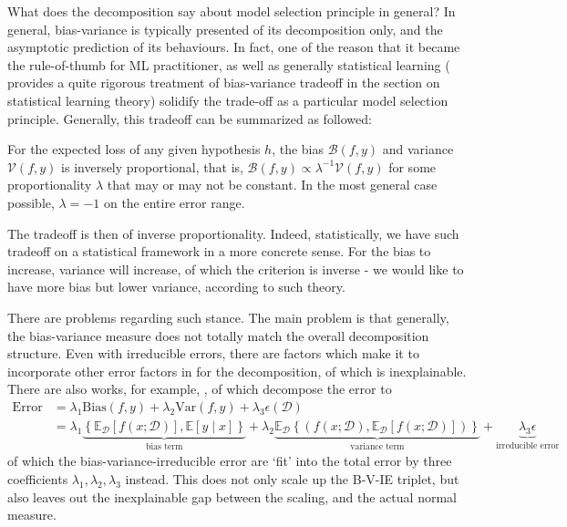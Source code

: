 What does the decomposition say about model selection principle in general? In general, bias-variance is typically presented of its decomposition only, and the asymptotic prediction of its behaviours. In fact, one of the reason that it became the rule-of-thumb for ML practitioner, as well as generally statistical learning (\cite{lafon_understanding_2024} provides a quite rigorous treatment of bias-variance tradeoff in the section on statistical learning theory) solidify the trade-off as a particular model selection principle. Generally, this tradeoff can be summarized as followed: 
\begin{theorem}
    For the expected loss of any given hypothesis $h$, the bias $\mathcal{B}(f,y)$ and variance $\mathcal{V}(f,y)$ is inversely proportional, that is, $\mathcal{B}(f,y)\propto \lambda^{-1} \mathcal{V}(f,y)$ for some proportionality $\lambda$ that may or may not be constant. In the most general case possible, $\lambda = -1$ on the entire error range. 
\end{theorem}

The tradeoff is then of inverse proportionality. Indeed, statistically, we have such tradeoff on a statistical framework in a more concrete sense. For the bias to increase, variance will increase, of which the criterion is inverse - we would like to have more bias but lower variance, according to such theory. 

There are problems regarding such stance. The main problem is that generally, the bias-variance measure does not totally match the overall decomposition structure. Even with irreducible errors, there are factors which make it to incorporate other error factors in for the decomposition, of which is inexplainable. There are also works, for example, \cite{domingos_unifeid_2000}, of which decompose the error to 
\begin{equation*}
        \begin{split}
            \mathrm{Error} & = \lambda_{1} \mathrm{Bias}(f,y) + \lambda_{2}\mathrm{Var}(f,y)+ \lambda_{3}\epsilon(\mathcal{D})\\ 
            & = \lambda_{1}\underbrace{\left\{ \mathbb{E}_{\mathcal{D}}[f(x;\mathcal{D})] , \mathbb{E}[y\mid x] \right\}}_{\text{bias term}} +\lambda_{2} \underbrace{\mathbb{E}_{\mathcal{D}} \left\{(f(x;\mathcal{D}), \mathbb{E}_{\mathcal{D}}[f(x;\mathcal{D})])\right\}}_{\text{variance term}} +\underbrace{\lambda_{3}\epsilon}_{\text{irreducible error}}
        \end{split}
\end{equation*}
of which the bias-variance-irreducible error are `fit' into the total error by three coefficients $\lambda_{1},\lambda_{2},\lambda_{3}$ instead. This does not only scale up the B-V-IE triplet, but also leaves out the inexplainable gap between the scaling, and the actual normal measure. 

